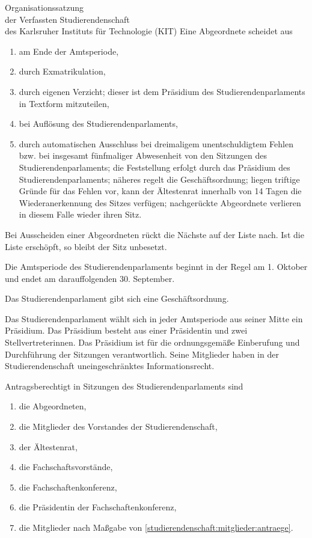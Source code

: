 \begin{jurdoc}[Organisationssatzung]{Organisationssatzung\\der Verfassten Studierendenschaft\\des Karlsruher Instituts für Technologie (KIT)}
Eine Abgeordnete scheidet aus \label{stupa:zusammensetzung:ausscheiden}
  \begin{enumerate}
  \item am Ende der Amtsperiode,
  \item durch Exmatrikulation,
  \item durch eigenen Verzicht; dieser ist dem Präsidium des Studierendenparlaments in Textform mitzuteilen,
  \item bei Auflösung des Studierendenparlaments,
  \item durch automatischen Ausschluss bei dreimaligem unentschuldigtem Fehlen bzw. bei insgesamt fünfmaliger Abwesenheit von den Sitzungen des Studierendenparlaments; die Feststellung erfolgt durch das Präsidium des Studierendenparlaments; näheres regelt die Geschäftsordnung; liegen triftige Gründe für das Fehlen vor, kann der Ältestenrat innerhalb von 14 Tagen die Wiederanerkennung des Sitzes verfügen; nachgerückte Abgeordnete verlieren in diesem Falle wieder ihren Sitz. \label{stupa:zusammensetzung:ausscheiden:wiederanerkennung}
\end{enumerate}
Bei Ausscheiden einer Abgeordneten rückt die Nächste auf der Liste nach. Ist die Liste erschöpft, so bleibt der Sitz unbesetzt.

Die Amtsperiode des Studierendenparlaments beginnt in der Regel am 1. Oktober und endet am darauffolgenden 30. September.



Das Studierendenparlament gibt sich eine Geschäftsordnung.

Das Studierendenparlament wählt sich in jeder Amtsperiode aus seiner Mitte ein Präsidium. Das Präsidium besteht aus einer Präsidentin und zwei Stellvertreterinnen. Das Präsidium ist für die ordnungsgemäße Einberufung und Durchführung der Sitzungen verantwortlich. Seine Mitglieder haben in der Studierendenschaft uneingeschränktes Informationsrecht.

Antragsberechtigt in Sitzungen des Studierendenparlaments sind
  \begin{enumerate}
  \item die Abgeordneten,
  \item die Mitglieder des Vorstandes der Studierendenschaft,
  \item der Ältestenrat,
  \item die Fachschaftsvorstände,
  \item die Fachschaftenkonferenz,
  \item die Präsidentin der Fachschaftenkonferenz,
  \item die Mitglieder nach Maßgabe von \ref{studierendenschaft:mitglieder:antraege}.
  \end{enumerate}


\end{jurdoc}
